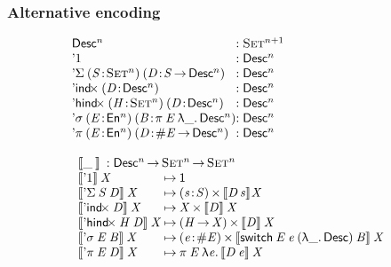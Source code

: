 \documentclass{beamer}
\begin{document}
\begin{frame}

\frametitle{Alternative encoding}

\[\stk{
\begin{array}{@{}l@{}l}
\Desc^n 
    &: \Set^{n+1}\\
\DUnit 
    &: \Desc^{n}\\
\DSigma{(\Bhab{\V{S}}{\Set^{n}})}{(\Bhab{\V{D}}{\V{S} \To \Desc^{n}})} 
    &: \Desc^{n}\\
\DIndx{(\Bhab{\V{D}}{\Desc^{n}})} 
    &: \Desc^{n} \\
\DHindx{(\Bhab{\V{H}}{\Set^n})}{(\Bhab{\V{D}}{\Desc^n})} 
    &: \Desc^n \\
\Dsigma{(\Bhab{\V{E}}{\EnumU^n})}{(\Bhab{\V{B}}{\spi{\V{E}}{\LAM{\_}{\Desc^n}}})}
    &: \Desc^n \\
\Dpi{(\Bhab{\V{E}}{\EnumU^n})}{(\Bhab{\V{D}}{\EnumT{\V{E}} \To \Desc^n})}
    &: \Desc^n
\end{array}
\\
\\
\begin{array}{l@{\:\mapsto\:}l}     
\multicolumn{2}{l}{\descop{\_\:}{} : \Desc^{n} \To \Set^{n} \To \Set^{n}} \\
\descop{\DUnit}{\V{X}} &  
     \Unit \\
\descop{\DSigma{\V{S}}{\V{D}}}{\V{X}} &
     \SIGMAS{\Bhab{\V{s}}{\V{S}}}{\descop{\V{D}\,\V{s}}{\!\V{X}}}  \\
\descop{\DIndx{\V{D}}}{\V{X}}  &  
     \TIMES{\V{X}}{\descop{\V{D}}{\V{X}}} \\
\descop{\DHindx{\V{H}}{\V{D}}}{\V{X}} &
     \TIMES{(\V{H} \To \V{X})}{\descop{\V{D}}{\V{X}}} \\
\descop{\Dsigma{\V{E}}{\V{B}}}{\V{X}} &
     \SIGMAS{\Bhab{\V{e}}{\EnumT{\V{E}}}}{\descop{\switch{\V{E}}{\V{e}}{(\LAM{\_}{\Desc})}{\V{B}}}{\V{X}}} \\
\descop{\Dpi{\V{E}}{\V{D}}}{\V{X}} &
     \spi{\V{E}}{\LAM{\V{e}}{\descop{\V{D}\: \V{e}}{\V{X}}}}
\end{array}
}\]


\end{frame}
\end{document}
